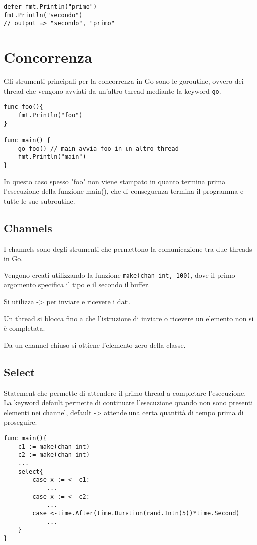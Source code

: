 \begin{verbatim}
defer fmt.Println("primo")
fmt.Println("secondo")
// output => "secondo", "primo"
\end{verbatim}

\section{Concorrenza}
Gli strumenti principali per la concorrenza in Go sono le goroutine, ovvero dei thread che vengono avviati da un'altro thread mediante la keyword \texttt{go}.

\begin{verbatim}
func foo(){
    fmt.Println("foo")
}

func main() {
    go foo() // main avvia foo in un altro thread
    fmt.Println("main")
}
\end{verbatim}

\begin{note}
    In questo caso spesso "foo" non viene stampato in quanto termina prima l'esecuzione della funzione main(), che di conseguenza termina il programma e tutte le sue subroutine.
\end{note}

\subsection{Channels}
I channels sono degli strumenti che permettono la comunicazione tra due threads in Go.

\spacer
Vengono creati utilizzando la funzione \texttt{make(chan int, 100)}, dove il primo argomento specifica il tipo e il secondo il buffer.

Si utilizza -> per inviare e ricevere i dati.

\spacer
Un thread si blocca fino a che l'istruzione di inviare o ricevere un elemento non si è completata.

Da un channel chiuso si ottiene l'elemento zero della classe.

\subsection{Select}
Statement che permette di attendere il primo thread a completare l'esecuzione.
La keyword default permette di continuare l'esecuzione quando non sono presenti elementi nei channel, default -> attende una certa quantità di tempo prima di proseguire.

\begin{verbatim}
func main(){
    c1 := make(chan int)
    c2 := make(chan int)
    ...
    select{
        case x := <- c1:
            ...
        case x := <- c2:
            ...
        case <-time.After(time.Duration(rand.Intn(5))*time.Second)
            ...
    }
}
\end{verbatim}

